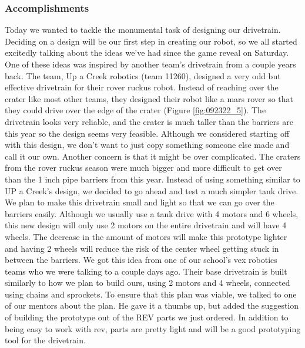 \subsubsection*{Accomplishments}
Today we wanted to tackle the monumental task of designing our drivetrain. Deciding on a design will be our first step in creating our robot, so we all started excitedly talking about the ideas we’ve had since the game reveal on Saturday. One of these ideas was inspired by another team’s drivetrain from a couple years back. The team, Up a Creek robotics (team 11260), designed a very odd but effective drivetrain for their rover ruckus robot. Instead of reaching over the crater like most other teams, they designed their robot like a mars rover so that they could drive over the edge of the crater (Figure \ref{fig:092322_5}). The drivetrain looks very reliable, and the crater is much taller than the barriers are this year so the design seems very feasible. Although we considered starting off with this design, we don't want to just copy something someone else made and call it our own. Another concern is that it might be over complicated. The craters from the rover ruckus season were much bigger and more difficult to get over than the 1 inch pipe barriers from this year. 
Instead of using something similar to UP a Creek’s design, we decided to go ahead and test a much simpler tank drive. We plan to make this drivetrain small and light so that we can go over the barriers easily. Although we usually use a tank drive with 4 motors and 6 wheels, this new design will only use 2 motors on the entire drivetrain and will have 4 wheels. The decrease in the amount of motors will make this prototype lighter and having 2 wheels will reduce the risk of the center wheel getting stuck in between the barriers. We got this idea from one of our school’s vex robotics teams who we were talking to a couple days ago. Their base drivetrain is built similarly to how we plan to build ours, using 2 motors and 4 wheels, connected using chains and sprockets. To ensure that this plan was viable, we talked to one of our mentors about the plan. He gave it a thumbs up, but added the suggestion of building the prototype out of the REV parts we just ordered. In addition to being easy to work with rev, parts are pretty light and will be a good prototyping tool for the drivetrain. 


